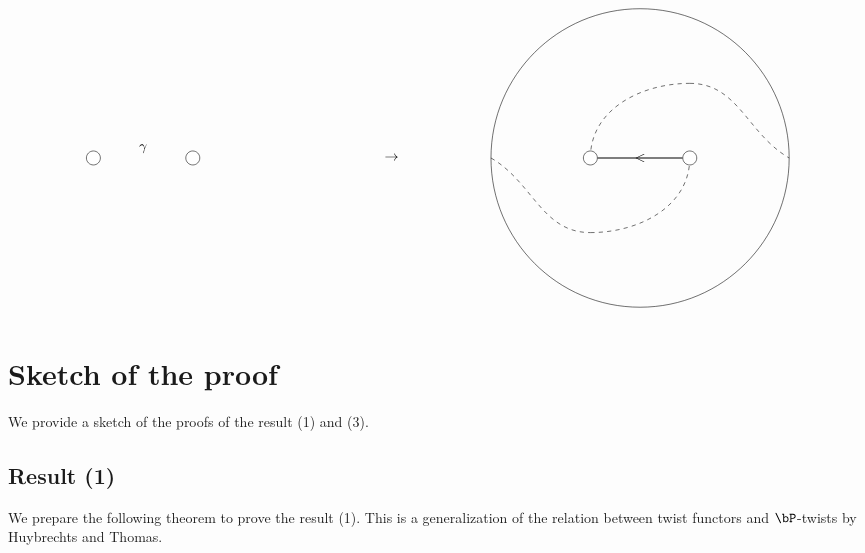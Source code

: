 \documentclass[a0,landscape]{a0poster}
\theoremstyle{plain}
\theoremstyle{definition}
\begin{document}
\begin{multicols}{3}
\begin{center}
\begin{displaymath}
\begin{tikzpicture}[scale=2.5]
                \foreach \u in {-0.5, 0.5}
                    {
                        \filldraw[white] (\u, 1.5) circle (2pt);
                        \draw[black] (\u, 1.5) circle (2pt);
                    }
                \draw(0, 1.5) node[above]{$\gamma$};

                \draw(2.5, 1.5) node{$\rightarrow$};

                \draw (0+5, 1.5) circle[radius=1.5];
                \draw[thick] (-0.5+5, 1.5)--(0.5+5, 1.5);
                \draw(5, 1.5) node{$<$};


                \draw[dashed](-1.5+5, 1.5) to[out=-30,in=180](-0.5+5, 0.75);
                \draw[dashed](-0.5+5, 0.75) to[out=0,in=-90](0.5+5, 1.5);

                \draw[dashed](-0.5+5, 1.5) to[out=90,in=180](0.5+5, 2.25);
                \draw[dashed](0.5+5, 2.25) to[out=0,in=150](1.5+5, 1.5);


                \foreach \u in {-0.5, 0.5}
                    {
                        \filldraw[white] (\u+5, 1.5) circle (2pt);
                        \draw[black] (\u+5, 1.5) circle (2pt);
                    }
            \end{tikzpicture}
        \end{displaymath}
    \end{center}


    \color{NavyBlue}\section{Sketch of the proof}

    \color{DarkSlateGray}
    We provide a sketch of the proofs of the result (1) and (3).
    \subsection{Result (1)}
    We prepare the following theorem to prove the result (1). This is a generalization of the relation between twist functors and $\bP$-twists by Huybrechts and Thomas.



\end{multicols}
\end{document}
